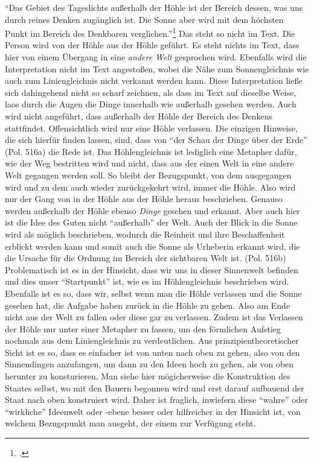 \enquote{Das Gebiet des Tageslichts außerhalb der Höhle ist der Bereich dessen, was uns durch reines Denken zugänglich ist. Die Sonne aber wird mit dem höchsten Punkt im Bereich des Denkbaren verglichen.}\footcite[][S. 49]{DisseMetaphysik} Das steht so nicht im Text. Die Person wird von der Höhle aus der Höhle geführt. Es steht nichts im Text, dass hier von einem Übergang in eine \emph{andere Welt} gesprochen wird. Ebenfalls wird die Interpretation nicht im Text angestoßen, wobei die Nähe zum Sonnengleichnis wie auch zum Liniengleichnis nicht verkannt werden kann. Diese Interpretation ließe sich dahingehend nicht so scharf zeichnen, als dass im Text auf dieselbe Weise, laos durch die Augen die Dinge innerhalb wie außerhalb gesehen werden. Auch wird nicht angeführt, dass außerhalb der Höhle der Bereich des Denkens stattfindet. Offensichtlich wird nur eine Höhle verlassen. Die einzigen Hinweise, die sich hierfür finden lassen, sind, dass von \enquote{der Schau der Dinge über der Erde} (Pol. 516a) die Rede ist. 
Das Höhlengleichnis ist lediglich eine Metapher dafür, wie der Weg bestritten wird und nicht, dass aus der einen Welt in eine andere Welt gegangen werden soll. So bleibt der Bezugspunkt, von dem ausgegangen wird und zu dem auch wieder zurückgekehrt wird, immer die Höhle. Also wird nur der Gang von in der Höhle aus der Höhle heraus beschrieben. Genauso werden außerhalb der Höhle ebenso \emph{Dinge} gesehen und erkannt. Aber auch hier ist die Idee des Guten nicht \enquote{außerhalb} der Welt. Auch der Blick in die Sonne wird als möglich beschrieben, wodurch die Reinheit und ihre Beschaffenheit erblickt werden kann und somit auch die Sonne als Urheberin erkannt wird, die die Ursache für die Ordnung im Bereich der sichtbaren Welt ist. (Pol. 516b)
Problematisch ist es in der Hinsicht, dass wir uns in dieser Sinnenwelt befinden und dies unser \enquote{Startpunkt} ist, wie es im Höhlengleichnis beschrieben wird. Ebenfalls ist es so, dass wir, selbst wenn man die Höhle verlassen und die Sonne gesehen hat, die Aufgabe haben zurück in die Höhle zu gehen. Also am Ende nicht aus der Welt zu fallen oder diese gar zu verlassen. Zudem ist das Verlassen der Höhle nur unter einer Metapher zu fassen, um den förmlichen Aufstieg nochmals aus dem Liniengleichnis zu verdeutlichen.
Aus prinzipientheoretischer Sicht ist es so, dass es einfacher ist von unten nach oben zu gehen, also von den Sinnendingen anzufangen, um dann zu den Ideen hoch zu gehen, als von oben herunter zu konsturieren. Man siehe hier mögicherweise die Konstruktion des Staates selbst, wo mit den Bauern begonnen wird und erst darauf aufbauend der Staat nach oben konstruiert wird. Daher ist fraglich, inwiefern diese \enquote{wahre} oder \enquote{wirkliche} Ideenwelt oder -ebene besser oder hilfreicher in der Hinsicht ist, von welchem Bezugspunkt man ausgeht, der einem zur Verfügung steht. 
